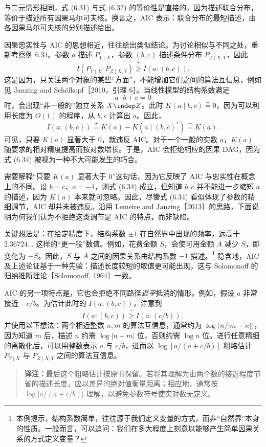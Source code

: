 与二元情形相同，式 (6.31) 与式 (6.32) 的等价性是直接的，因为描述联合分布，等价于描述所有因果马尔可夫核。换言之，AIC 表示：联合分布的最短描述，由各因果马尔可夫核的分别描述给出。

因果忠实性与 AIC 的思想相近，往往给出类似结论。为讨论相似与不同之处，重新考察例 6.34。参数 $a$ 描述 $P_{Y\mid X}$，参数 $(b,c)$ 描述条件分布 $P_{Z\mid X,Y}$，因此
\begin{equation}
 I(P_{Y\mid X}:P_{Z\mid X,Y})\overset{+}{\ge}I(a:(b,c)).
 \tag{6.33}
\end{equation}
这是因为，只关注两个对象的某些“方面”，不能增加它们之间的算法互信息，例如见 Janzing and Schölkopf［2010，引理 6］。当线性模型的结构系数满足
\begin{equation}
 a\cdot b+c=0
 \tag{6.34}
\end{equation}
时，会出现“非一般的”独立关系 $X\indep Z$。此时 $K(a\mid b,c)\overset{+}{=}0$，因为可以利用长度为 $O(1)$ 的程序，从 $b,c$ 计算出 $a$。因此，
\[
 I(a:(b,c))\overset{+}{=}K(a)-K(a\mid(b,c)^*)\overset{+}{=}K(a).
\]
可见，只要 $K(a)$ 显著大于 $0$，就违反 AIC。对于一个一般的实数 $a$，$K(a)$ 随要求的相对精度提高而按对数增长。于是，AIC 会拒绝相应的因果 DAG，因为式 (6.34) 被视为一种不大可能发生的巧合。

需要解释“只要 $K(a)$ 显著大于 $0$”这句话，因为它反映了 AIC 与忠实性在概念上的不同。设 $b=c$、$a=-1$，则式 (6.34) 成立，但知道 $b,c$ 并不能进一步缩短 $a$ 的描述，因为 $K(a)$ 本来就可忽略。因此，尽管式 (6.34) 看似体现了参数的精细调节，AIC 却并未被违反。沿用 Lemeire and Janzing［2013］的思路，下面说明为何我们认为不拒绝这类调节是 AIC 的特点，而非缺陷。

关键想法是：在给定精度下，结构系数 $\pm1$ 在自然界中出现的频率，远高于 $2.36724\ldots$ 这样的“更一般”数值。例如，花费金额 $S$，会使可用金额 $A$ 减少 $S$，即变化为 $-S$。因此，$S$ 与 $A$ 之间的因果关系由结构系数 $-1$ 描述。\footnote{本例提示，结构系数简单，往往源于我们定义变量的方式，而非“自然界”本身的性质。一般而言，可以追问：我们在多大程度上刻意以能够产生简单因果关系的方式定义变量？}
隐含地，AIC 及上述论证基于一种先验：描述长度较短的取值更可能出现，这与 Solomonoff 的归纳推断理论［Solomonoff, 1964］一致。

AIC 的另一项特点是，它也会拒绝不同路径\emph{近乎}抵消的情形。例如，假设 $a$ 非常接近 $-c/b$。为估计此时的 $I(a:(b,c))$，注意到
\[
 I(a:(b,c))\overset{+}{\ge}I(a:(c/b)),
\]
并使用以下想法：两个相近整数 $n,m$ 的算法互信息，通常约为 $\log\bigl(n/|m-n|\bigr)$，因为知道 $m$ 后，描述 $n$ 约需 $\log|n-m|$ 位，否则约需 $\log n$ 位。进行任意精细的离散化后，可以用整数表示 $a$ 与 $c/b$，进而以 $\log[a/(a+c/b)]$ 粗略估计 $P_{Y\mid X}$ 与 $P_{Z\mid X,Y}$ 之间的算法互信息。
\begin{quote}\small
\textbf{译注：}最后这个粗略估计按原书保留。若将其理解为由两个数的接近程度节省的描述长度，应以差异的绝对值衡量距离；相应地，通常按 $\log|a/(a+c/b)|$ 理解，以避免参数符号使实对数无定义。
\end{quote}
\FloatBarrier
